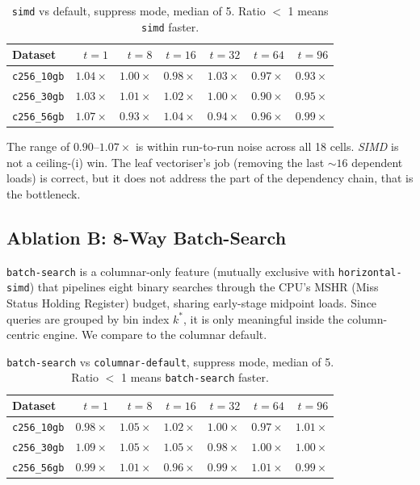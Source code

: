 \begin{table}[H]
  \centering
  \caption[\texttt{simd} vs.\ default.]{\texttt{simd} vs default, suppress mode, median of 5. Ratio $<$ 1 means \texttt{simd} faster.}
  \label{tab:simd}
  \begin{tabular}{lrrrrrr}
    \toprule
    Dataset & $t{=}1$ & $t{=}8$ & $t{=}16$ & $t{=}32$ & $t{=}64$ & $t{=}96$ \\
    \midrule
    \texttt{c256\_10gb} & $1.04\times$ & $1.00\times$ & $0.98\times$ & $1.03\times$ & $0.97\times$ & $0.93\times$ \\
    \texttt{c256\_30gb} & $1.03\times$ & $1.01\times$ & $1.02\times$ & $1.00\times$ & $0.90\times$ & $0.95\times$ \\
    \texttt{c256\_56gb} & $1.07\times$ & $0.93\times$ & $1.04\times$ & $0.94\times$ & $0.96\times$ & $0.99\times$ \\
    \bottomrule
  \end{tabular}
\end{table}

The range of $0.90$--$1.07\times$ is within run-to-run noise across all 18 cells. \emph{SIMD} is not a ceiling-(i) win. The leaf vectoriser's job (removing the last ${\sim}16$ dependent loads) is correct, but it does not address the part of the dependency chain, that is the bottleneck. 

\subsection{Ablation B: 8-Way Batch-Search\label{sec:exp:c1:batch}}

\texttt{batch-search} is a columnar-only feature (mutually exclusive with \texttt{horizontal-\allowbreak simd}) that pipelines eight binary searches through the CPU's MSHR (Miss Status Holding Register) budget, sharing early-stage midpoint loads. Since queries are grouped by bin index $k^*$, it is only meaningful inside the column-centric engine. We compare to the columnar default.

\begin{table}[H]
  \centering
  \caption[\texttt{batch-search} vs.\ columnar default.]{\texttt{batch-search} vs \texttt{columnar-default}, suppress mode, median of 5. Ratio $<$ 1 means \texttt{batch-search} faster.}
  \label{tab:batchsearch}
  \begin{tabular}{lrrrrrr}
    \toprule
    Dataset & $t{=}1$ & $t{=}8$ & $t{=}16$ & $t{=}32$ & $t{=}64$ & $t{=}96$ \\
    \midrule
    \texttt{c256\_10gb} & $0.98\times$ & $1.05\times$ & $1.02\times$ & $1.00\times$ & $0.97\times$ & $1.01\times$ \\
    \texttt{c256\_30gb} & $1.09\times$ & $1.05\times$ & $1.05\times$ & $0.98\times$ & $1.00\times$ & $1.00\times$ \\
    \texttt{c256\_56gb} & $0.99\times$ & $1.01\times$ & $0.96\times$ & $0.99\times$ & $1.01\times$ & $0.99\times$ \\
    \bottomrule
  \end{tabular}
\end{table}


